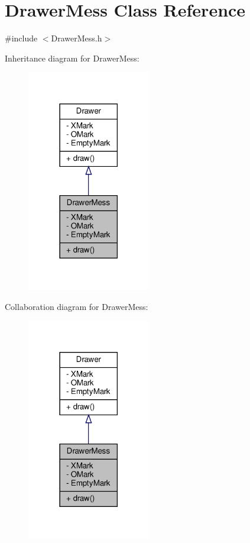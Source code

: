 \hypertarget{classDrawerMess}{}\section{Drawer\+Mess Class Reference}
\label{classDrawerMess}


{\ttfamily \#include $<$Drawer\+Mess.\+h$>$}



Inheritance diagram for Drawer\+Mess\+:
\nopagebreak
\begin{figure}[H]
\begin{center}
\leavevmode
\includegraphics[width=153pt]{classDrawerMess__inherit__graph}
\end{center}
\end{figure}


Collaboration diagram for Drawer\+Mess\+:
\nopagebreak
\begin{figure}[H]
\begin{center}
\leavevmode
\includegraphics[width=153pt]{classDrawerMess__coll__graph}
\end{center}
\end{figure}
